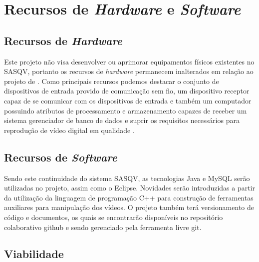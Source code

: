 \chapter{Recursos de \emph{Hardware} e \emph{Software}}

\section{Recursos de \emph{Hardware}}

Este projeto não visa desenvolver ou aprimorar equipamentos físicos existentes no SASQV, portanto os recursos de \emph{hardware} permanecem inalterados em relação ao projeto de \cite{sasqv}. Como principais recursos podemos destacar o conjunto de dispositivos de entrada provido de comunicação sem fio, um dispositivo receptor capaz de se comunicar com os dispositivos de entrada e também um computador possuindo atributos de processamento e armazenamento capazes de receber um sistema gerenciador de banco de dados e suprir os requisitos necessários para reprodução de vídeo digital em qualidade .

\section{Recursos de \emph{Software}}

Sendo este continuidade do sistema SASQV, as tecnologias Java e MySQL serão utilizadas no projeto, assim como o  Eclipse. Novidades serão introduzidas a partir da utilização da linguagem de programação C++ para construção de ferramentas auxiliares para manipulação dos vídeos. O projeto também terá versionamento de código e documentos, os quais se encontrarão disponíveis no repositório colaborativo github \cite{githubabout} e sendo gerenciado pela ferramenta livre git. 
\section{Viabilidade}

